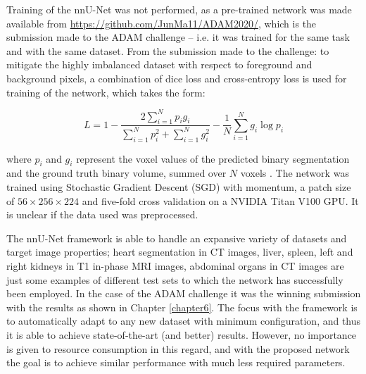 Training of the nnU-Net was not performed, as a pre-trained network was made available from \href{https://github.com/JunMa11/ADAM2020/}{https://github.com/JunMa11/ADAM2020/}, which is the submission made to the ADAM challenge -- i.e. it was trained for the same task and with the same dataset. From the submission made to the challenge: to mitigate the highly imbalanced dataset with respect to foreground and background pixels, a combination of dice loss and cross-entropy loss is used for training of the network, which takes the form:

\[L = 1 - \frac{2\sum_{i=1}^{N}p_{i}g_{i}}{\sum_{i=1}^{N}p_{i}^{2} + \sum_{i=1}^{N}g_{i}^{2}} - \frac{1}{N}\sum_{i=1}^{N}g_{i}\log p_{i}\]

where $p_{i}$ and $g_{i}$ represent the voxel values of the predicted binary segmentation and the ground truth binary volume, summed over $N$ voxels \cite{milletari2016v}. The network was trained using Stochastic Gradient Descent (SGD) with momentum, a patch size of $56 \times 256 \times 224$ and five-fold cross validation on a NVIDIA Titan V100 GPU. It is unclear if the data used was preprocessed. 

The nnU-Net framework is able to handle an expansive variety of datasets and target image properties; heart segmentation in CT images, liver, spleen, left and right kidneys in T1 in-phase MRI images, abdominal organs in CT images are just some examples of different test sets to which the network has successfully been employed. In the case of the ADAM challenge it was the winning submission with the results as shown in Chapter \ref{chapter6}. The focus with the framework is to automatically adapt to any new dataset with minimum configuration, and thus it is able to achieve state-of-the-art (and better) results. However, no importance is given to resource consumption in this regard, and with the proposed network the goal is to achieve similar performance with much less required parameters.


